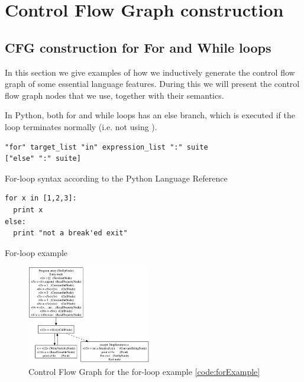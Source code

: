 \chapter{Control Flow Graph construction}
\label{chap:CFGConstruction}

\section{CFG construction for For and While loops}
\label{sec:CFGConstructionLoops}
In this section we give examples of how we inductively generate the control flow graph of some essential language features. 
During this we will present the control flow graph nodes that we use, together with their semantics.

In Python, both for and while loops has an else branch, which is executed if the loop terminates normally (i.e. not using ).

\begin{listing}[H]
  \begin{verbatim}
"for" target_list "in" expression_list ":" suite 
["else" ":" suite]
  \end{verbatim}
  \caption{For-loop syntax according to the Python Language Reference}\label{code:forSyntax}
\end{listing}

\begin{listing}[H]
  \begin{verbatim}
for x in [1,2,3]:
  print x
else:
  print "not a break'ed exit"
  \end{verbatim}
  \caption{For-loop example}\label{code:forExample}
\end{listing}

\begin{figure}
  \vspace{-20pt}
  \begin{center}
    \includegraphics[width=0.48\textwidth]{images/for-example-cfg.png}
  \end{center}
  \vspace{-10pt}
  \caption{Control Flow Graph for the for-loop example \ref{code:forExample}}
  \label{fig:forCfg}
  \vspace{-10pt}
\end{figure}

